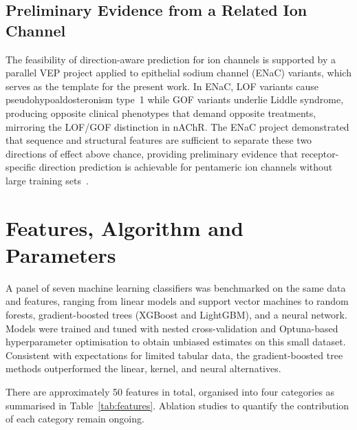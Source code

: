 \documentclass{ws-procs11x85}
\begin{document}
\subsection{Preliminary Evidence from a Related Ion Channel}

The feasibility of direction-aware prediction for ion channels is
supported by a parallel VEP project applied to epithelial sodium channel
(ENaC) variants, which serves as the template for the present work.
In ENaC, LOF variants cause pseudohypoaldosteronism type~1 while GOF
variants underlie Liddle syndrome, producing opposite clinical
phenotypes that demand opposite treatments, mirroring the LOF/GOF
distinction in nAChR. The ENaC project demonstrated that sequence and
structural features are sufficient to separate these two directions of
effect above chance, providing preliminary evidence that
receptor-specific direction prediction is achievable for pentameric ion
channels without large training sets~\cite{enac}.

\section{Features, Algorithm and Parameters}\label{sec:algorithms}
A panel of seven machine learning classifiers was benchmarked on the same
data and features, ranging from linear models and support vector machines
to random forests, gradient-boosted trees (XGBoost and LightGBM), and a
neural network. Models were trained and tuned with nested cross-validation
and Optuna-based hyperparameter optimisation to obtain unbiased estimates
on this small dataset. Consistent with expectations for limited
tabular data, the gradient-boosted tree methods outperformed the linear,
kernel, and neural alternatives.

There are approximately 50 features in total, organised into four
categories as summarised in Table~\ref{tab:features}. Ablation studies
to quantify the contribution of each category remain ongoing.
\end{document}
